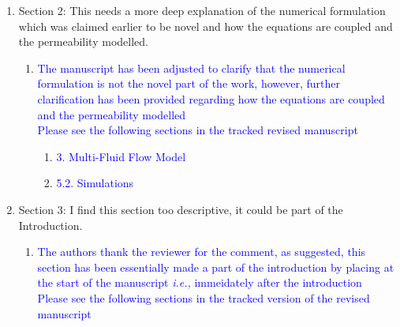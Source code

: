 \documentclass[11pt]{letter} %
\newcommand{\blue}{\textcolor{blue}}
\newcommand{\ie}{{\it i.e., }}
\begin{document}
\begin{letter}
{\begin{enumerate}
\begin{enumerate}
   \begin{enumerate}
   \item \label{R_R2_TooMuchSum_1} \blue{The authors thank the reviewer for the comment, as advised, the latter part of the introduction has been made brief. Additionally, the extensive details in the introduction section which was referred to has been moved to the section on "Model Description and Simulation Setup".}\\
     \blue{Please see the following sections in the tracked version of the revised manuscript}
   \begin{enumerate}
 \item \blue{5. Model Description and Simulation Setup}
   \end{enumerate}
        \end{enumerate}
\item \label{R_R2_NumFormulation} Section 2: This needs a more deep explanation of the numerical formulation which was claimed earlier to be novel and how the equations are coupled and the permeability modelled.
   \begin{enumerate}
   \item \label{R_R2_NumFormulation_1} \blue{The manuscript has been adjusted to clarify that the numerical formulation is not the novel part of the work, however, further clarification has been provided regarding how the equations are coupled and the permeability modelled}\\
     \blue{Please see the following sections in the tracked revised manuscript}
   \begin{enumerate}
\item \blue{3. Multi-Fluid Flow Model}
 \item \blue{5.2. Simulations}
   \end{enumerate}
        \end{enumerate}
\item \label{R_R2_TooDesc} Section 3: I find this section too descriptive, it could be part of the Introduction.
 \begin{enumerate}
 \item \label{R_R2_TooDesc_1} \blue{The authors thank the reviewer for the comment, as suggested, this section has been essentially made a part of the introduction by placing at the start of the manuscript \ie{immeidately after the introduction}}\\
   \blue{Please see the following sections in the tracked version of the revised manuscript}
   \begin{enumerate}

\end{enumerate}
\end{enumerate}
\end{enumerate}
\end{enumerate}}
\end{letter}
\end{document}
